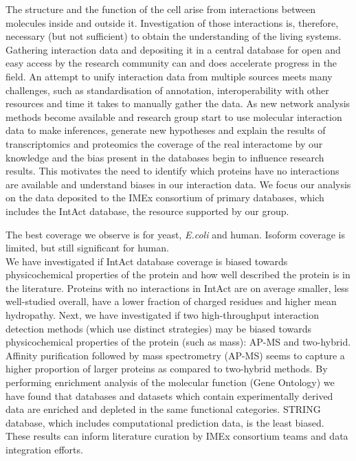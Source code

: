 \documentclass[12pt,]{report}
\begin{document}
The structure and the function of the cell arise from interactions
between molecules inside and outside it. Investigation of those
interactions is, therefore, necessary (but not sufficient) to obtain the
understanding of the living systems. Gathering interaction data and
depositing it in a central database for open and easy access by the
research community can and does accelerate progress in the field. An
attempt to unify interaction data from multiple sources meets many
challenges, such as standardisation of annotation, interoperability with
other resources and time it takes to manually gather the data. As new
network analysis methods become available and research group start to
use molecular interaction data to make inferences, generate new
hypotheses and explain the results of transcriptomics and proteomics the
coverage of the real interactome by our knowledge and the bias present
in the databases begin to influence research results. This motivates the
need to identify which proteins have no interactions are available and
understand biases in our interaction data. We focus our analysis on the
data deposited to the IMEx consortium of primary databases, which
includes the IntAct database, the resource supported by our group.

The best coverage we observe is for yeast, \emph{E.coli} and human.
Isoform coverage is limited, but still significant for human.\\
We have investigated if IntAct database coverage is biased towards
physicochemical properties of the protein and how well described the
protein is in the literature. Proteins with no interactions in IntAct
are on average smaller, less well-studied overall, have a lower fraction
of charged residues and higher mean hydropathy. Next, we have
investigated if two high-throughput interaction detection methods (which
use distinct strategies) may be biased towards physicochemical
properties of the protein (such as mass): AP-MS and two-hybrid. Affinity
purification followed by mass spectrometry (AP-MS) seems to capture a
higher proportion of larger proteins as compared to two-hybrid methods.
By performing enrichment analysis of the molecular function (Gene
Ontology) we have found that databases and datasets which contain
experimentally derived data are enriched and depleted in the same
functional categories. STRING database, which includes computational
prediction data, is the least biased.\\
These results can inform literature curation by IMEx consortium teams
and data integration efforts.
\end{document}
